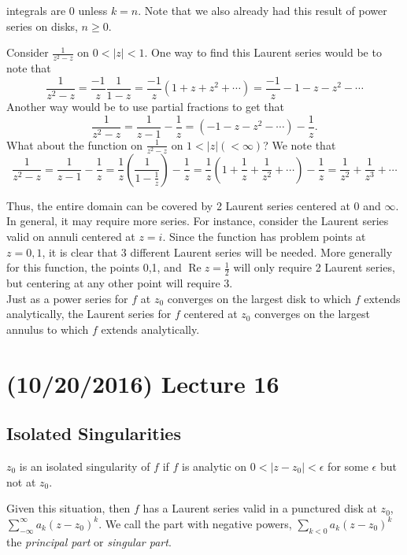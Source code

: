 \documentclass[11pt,leqno,oneside]{amsart}
\numberwithin{thm}{section}
\renewcommand{\Re}{\operatorname{Re}}
\begin{document}
  integrals are 0 unless $k=n$. Note that we also already had this
  result of power series on disks, $n \geq 0$.
  \begin{example}
    Consider $\frac{1}{z^2-z}$ on $0 < |z| < 1$. One way to find this
    Laurent series would be to note that \[
      \frac{1}{z^2-z} = \frac{-1}{z}\frac{1}{1-z} =
      \frac{-1}{z}(1+z+z^2+\cdots) = \frac{-1}{z}-1-z-z^2-\cdots
    \]
    Another way would be to use partial fractions to get that \[
      \frac{1}{z^2-z} = \frac{1}{z-1} - \frac{1}{z} =
      (-1-z-z^2-\cdots) - \frac{1}{z}.
    \]
    What about the function on $\frac{1}{z^2-z}$ on $1 < |z| (<
    \infty)$? We note that \[
      \frac{1}{z^2-z} = \frac{1}{z-1} - \frac{1}{z} =
      \frac{1}{z}\left(\frac{1}{1-\frac{1}{z}}\right) - \frac{1}{z} =
      \frac{1}{z}\left( 1 + \frac{1}{z} + \frac{1}{z^2} + \cdots \right) -
        \frac{1}{z} = \frac{1}{z^2} + \frac{1}{z^3} + \cdots
    \]
  \end{example}
  Thus, the entire domain can be covered by 2 Laurent series centered
  at 0 and $\infty$.  In general, it may require more series. For
  instance, consider the Laurent series valid on annuli centered at
  $z=i$. Since the function has problem points at $z=0,1$, it is clear
  that 3 different Laurent series will be needed. More generally for
  this function, the points 0,1, and $\Re z = \frac{1}{2}$ will only
  require 2 Laurent series, but centering at any other point will
  require 3. \\

  Just as a power series for $f$ at $z_0$ converges on the largest
  disk to which $f$ extends analytically, the Laurent series for $f$
  centered at $z_0$ converges on the largest annulus to which $f$
  extends analytically.

  \section{(10/20/2016) Lecture 16}
  \subsection*{Isolated Singularities}
  \begin{defn}
    $z_0$ is an isolated singularity of $f$ if $f$ is analytic on $0 <
    |z-z_0| < \epsilon$ for some $\epsilon$ but not at $z_0$.
  \end{defn}
  Given this situation, then $f$ has a Laurent series valid in a
  punctured disk at $z_0$, $\sum_{-\infty}^\infty a_k(z-z_0)^k$. We
  call the part with negative powers, $\sum_{k < 0} a_k(z-z_0)^k$ the
  \emph{principal part} or \emph{singular part}.
\end{document}
